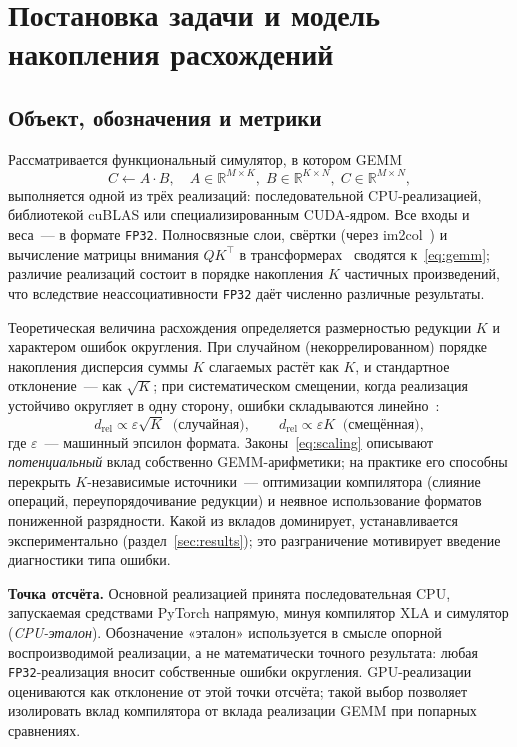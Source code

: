 \section{Постановка задачи и модель накопления расхождений}
\label{sec:model}

\subsection{Объект, обозначения и метрики}

Рассматривается функциональный симулятор, в котором GEMM
\begin{equation}
    \label{eq:gemm}
    C \leftarrow A \cdot B, \quad
    A\in\mathbb{R}^{M\times K},\;
    B\in\mathbb{R}^{K\times N},\;
    C\in\mathbb{R}^{M\times N},
\end{equation}
выполняется одной из трёх реализаций: последовательной CPU-реализацией,
библиотекой cuBLAS или специализированным CUDA-ядром. Все входы и веса~--- в
формате \texttt{FP32}. Полносвязные слои, свёртки (через
im2col~\cite{Chellapilla2006}) и вычисление матрицы внимания $QK^\top$ в
трансформерах~\cite{Vaswani2017} сводятся к~\eqref{eq:gemm}; различие реализаций
состоит в порядке накопления $K$ частичных произведений, что вследствие
неассоциативности \texttt{FP32} даёт численно различные результаты.

Теоретическая величина расхождения определяется размерностью редукции $K$ и
характером ошибок округления. При случайном (некоррелированном) порядке
накопления дисперсия суммы $K$ слагаемых растёт как $K$, и стандартное
отклонение~--- как $\sqrt{K}$; при систематическом смещении, когда реализация
устойчиво округляет в одну сторону, ошибки складываются
линейно~\cite[§\,2.9, теор.~3.1]{Higham2002}:
\begin{equation}
    \label{eq:scaling}
    d_{\text{rel}} \propto \varepsilon\sqrt{K} \;\;\text{(случайная)},
    \qquad
    d_{\text{rel}} \propto \varepsilon K \;\;\text{(смещённая)},
\end{equation}
где $\varepsilon$~--- машинный эпсилон формата. Законы~\eqref{eq:scaling}
описывают \emph{потенциальный} вклад собственно GEMM-арифметики; на практике его
способны перекрыть $K$-независимые источники~--- оптимизации компилятора (слияние
операций, переупорядочивание редукции) и неявное использование форматов
пониженной разрядности. Какой из вкладов доминирует, устанавливается
экспериментально (раздел~\ref{sec:results}); это разграничение мотивирует
введение диагностики типа ошибки.

\textbf{Точка отсчёта.} Основной реализацией принята последовательная CPU,
запускаемая средствами PyTorch напрямую, минуя компилятор XLA и симулятор
(\emph{CPU-эталон}). Обозначение «эталон» используется в смысле опорной
воспроизводимой реализации, а не математически точного результата: любая
\texttt{FP32}-реализация вносит собственные ошибки округления. GPU-реализации
оцениваются как отклонение от этой точки отсчёта; такой выбор позволяет
изолировать вклад компилятора от вклада реализации GEMM при попарных сравнениях.


